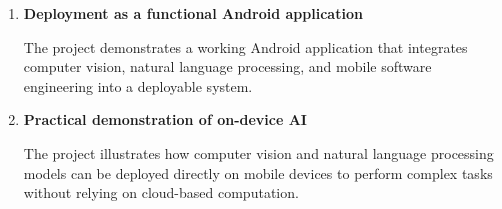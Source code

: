 \begin{enumerate}
\item \textbf{Deployment as a functional Android application}

The project demonstrates a working Android application that integrates computer vision, natural language processing, and mobile software engineering into a deployable system.

\item \textbf{Practical demonstration of on-device AI}

The project illustrates how computer vision and natural language processing models can be deployed directly on mobile devices to perform complex tasks without relying on cloud-based computation.

\end{enumerate}